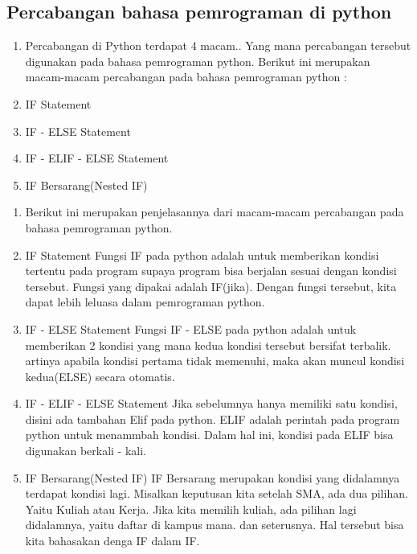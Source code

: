 \subsection { Percabangan bahasa pemrograman di python}
		 
		 \begin {enumerate}
			\item Percabangan di Python terdapat 4 macam.. Yang mana percabangan tersebut digunakan pada bahasa pemrograman python. Berikut ini merupakan macam-macam percabangan pada bahasa pemrograman python :
			\item IF Statement
			\item IF - ELSE Statement
			\item IF - ELIF - ELSE Statement
			\item IF Bersarang(Nested IF)
			\end {enumerate}
			
			\begin {enumerate}
			\item Berikut ini merupakan penjelasannya dari macam-macam percabangan pada bahasa pemrograman python.
			\item IF Statement Fungsi IF pada python adalah untuk memberikan kondisi tertentu pada program supaya program bisa berjalan sesuai dengan kondisi tersebut. Fungsi yang dipakai adalah IF(jika). Dengan fungsi tersebut, kita dapat lebih leluasa dalam pemrograman python.
			\item IF - ELSE Statement Fungsi IF - ELSE pada python adalah untuk memberikan 2 kondisi yang mana kedua kondisi tersebut bersifat terbalik. artinya apabila kondisi pertama tidak memenuhi, maka akan muncul kondisi kedua(ELSE) secara otomatis.
			\item IF - ELIF - ELSE Statement Jika sebelumnya hanya memiliki satu kondisi, disini ada tambahan Elif pada python. ELIF adalah perintah pada program python untuk menammbah kondisi. Dalam hal ini, kondisi pada ELIF bisa digunakan berkali - kali.
			\item IF Bersarang(Nested IF) IF Bersarang merupakan kondisi yang didalamnya terdapat kondisi lagi. Misalkan keputusan kita setelah SMA, ada dua pilihan. Yaitu Kuliah atau Kerja. Jika kita memilih kuliah, ada pilihan lagi didalamnya, yaitu daftar di kampus mana. dan seterusnya. Hal tersebut bisa kita bahasakan denga IF dalam IF.
\end {enumerate}
